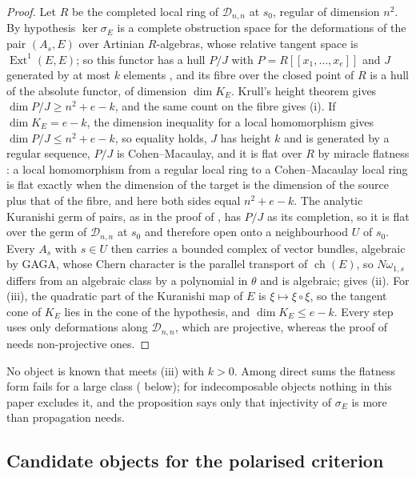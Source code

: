 \documentclass[11pt,reqno]{amsart}
\theoremstyle{plain}
\theoremstyle{definition}
\theoremstyle{remark}
\newcommand{\cD}{\mathcal{D}}
\DeclareMathOperator{\ch}{ch}
\DeclareMathOperator{\Ext}{Ext}
\begin{document}
\begin{proof}
Let $R$ be the completed local ring of $\cD_{n,n}$ at $s_{0}$, regular of
dimension $n^{2}$. By hypothesis $\ker\sigma_{E}$ is a complete obstruction
space for the deformations of the pair $(A_{s},E)$ over Artinian $R$-algebras,
whose relative tangent space is $\Ext^{1}(E,E)$; so this functor has a hull
$P/J$ with $P=R[[x_{1},\dots,x_{e}]]$ and $J$ generated by at most $k$
elements \cite{FM98}, and its fibre over the closed point of $R$ is a hull of
the absolute functor, of dimension $\dim K_{E}$. Krull's height theorem gives
$\dim P/J\ge n^{2}+e-k$, and the same count on the fibre gives (i). If
$\dim K_{E}=e-k$, the dimension inequality for a local homomorphism
\cite[Theorem~15.1]{Mat86} gives $\dim P/J\le n^{2}+e-k$, so equality holds, $J$
has height $k$ and is generated by a regular sequence, $P/J$ is
Cohen--Macaulay, and it is flat over $R$ by miracle flatness
\cite[Theorem~23.1]{Mat86}: a local homomorphism from a regular local ring to
a Cohen--Macaulay local ring is flat exactly when the dimension of the target
is the dimension of the source plus that of the fibre, and here both sides
equal $n^{2}+e-k$. The analytic Kuranishi germ of pairs, as in the
proof of , has $P/J$ as its completion, so it is flat over
the germ of $\cD_{n,n}$ at $s_{0}$ and therefore open onto a neighbourhood
$U$ of $s_{0}$. Every $A_{s}$ with $s\in U$ then carries a bounded complex of
vector bundles, algebraic by GAGA, whose Chern character is the parallel
transport of $\ch(E)$, so $N\omega_{1,s}$ differs from an algebraic class by a
polynomial in $\theta$ and is algebraic; \cite[Corollary~16.5]{paperI} gives (ii).
For (iii), the quadratic part of the Kuranishi map of $E$ is
$\xi\mapsto\xi\circ\xi$, so the tangent cone of $K_{E}$ lies in the cone of the
hypothesis, and $\dim K_{E}\le e-k$. Every step uses only deformations along
$\cD_{n,n}$, which are projective, whereas the proof of 
needs non-projective ones.
\end{proof}

No object is known that meets (iii) with $k>0$. Among direct sums the
flatness form fails for a large class ( below); for
indecomposable objects nothing in this paper excludes it, and the proposition
says only that injectivity of $\sigma_{E}$ is more than propagation needs.

\subsection{Candidate objects for the polarised criterion}
\end{document}
